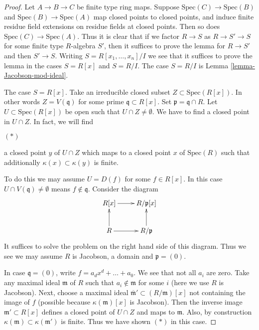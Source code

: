 \begin{proof}
Let $A \to B \to C$ be finite type ring maps.
Suppose $\text{Spec}(C) \to \text{Spec}(B)$ and
$\text{Spec}(B) \to \text{Spec}(A)$ map closed
points to closed points, and induce finite residue
field extensions on residue fields at closed points.
Then so does $\text{Spec}(C) \to \text{Spec}(A)$.
Thus it is clear that if we factor $R \to S$ as
$R \to S' \to S$ for some finite type $R$-algebra
$S'$, then it suffices to prove the lemma
for $R\to S'$ and then $S' \to S$.
Writing $S = R[x_1, \ldots, x_n]/I$ we see that
it suffices to prove the lemma in the cases
$S = R[x]$ and $S = R/I$. The case $S = R/I$
is Lemma \ref{lemma-Jacobson-mod-ideal}.

\medskip\noindent
The case  $S = R[x]$.
Take an irreducible closed subset
$Z \subset \text{Spec}(R[x])$.
In other words $Z = V(\mathfrak q)$ for some
prime $\mathfrak q \subset R[x]$. Set
$\mathfrak p = \mathfrak q \cap R$.
Let $U \subset \text{Spec}(R[x])$ be open
such that $U \cap Z \not = \emptyset$.
We have to find a closed point in $U \cap Z$.
In fact, we will find
\begin{list}{$(*)$}{}
\item
a closed point $y$ of $U \cap Z$
which maps to a closed point $x$ of $\text{Spec}(R)$
such that additionally $\kappa(x) \subset \kappa(y)$
is finite.
\end{list}
To do this we may assume $U = D(f)$ for some $f \in R[x]$.
In this case $U\cap V(\mathfrak q) \not = \emptyset$
means $f \not \in \mathfrak q$. Consider the diagram
$$
\xymatrix{
R[x] \ar[r] & R/\mathfrak p[x]  \\
R \ar[r] \ar[u] & R/\mathfrak p  \ar[u]
}
$$
It suffices to solve the problem on the right hand side
of this diagram. Thus
we see we may assume $R$ is Jacobson, a domain and
$\mathfrak p = (0)$.

\medskip\noindent
In case $\mathfrak q = (0)$, write $f = a_d x^d + \ldots + a_0$.
We see that not all $a_i$ are zero. Take any maximal ideal
$\mathfrak m$ of $R$ such that $a_i \not \in \mathfrak m$
for some $i$ (here we use $R$ is Jacobson). Next, choose
a maximal ideal $\overline{\mathfrak m}' \subset (R/\mathfrak m)[x]$
not containing the image of $f$ (possible because
$\kappa(\mathfrak m)[x]$ is Jacobson). Then the inverse image
$\mathfrak m' \subset R[x]$ defines a closed point of
$U \cap Z$ and maps to $\mathfrak m$. Also, by construction
$\kappa(\mathfrak m) \subset \kappa(\mathfrak m')$ is finite.
Thus we have shown $(*)$ in this case.


\end{proof}
